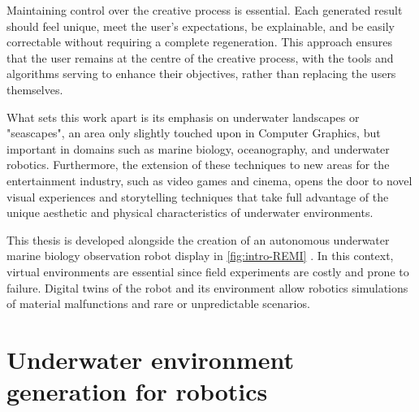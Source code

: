 Maintaining control over the creative process is essential. Each generated result should feel unique, meet the user's expectations, be explainable, and be easily correctable without requiring a complete regeneration. This approach ensures that the user remains at the centre of the creative process, with the tools and algorithms serving to enhance their objectives, rather than replacing the users themselves.

What sets this work apart is its emphasis on underwater landscapes or "seascapes", an area only slightly touched upon in Computer Graphics, but important in domains such as marine biology, oceanography, and underwater robotics. Furthermore, the extension of these techniques to new areas for the entertainment industry, such as video games and cinema, opens the door to novel visual experiences and storytelling techniques that take full advantage of the unique aesthetic and physical characteristics of underwater environments.

This thesis is developed alongside the creation of an autonomous underwater marine biology observation robot display in \cref{fig:intro-REMI} \cite{Maslin2021}. In this context, virtual environments are essential since field experiments are costly and prone to failure. Digital twins of the robot and its environment allow robotics simulations of material malfunctions and rare or unpredictable scenarios.

\section{Underwater environment generation for robotics}

